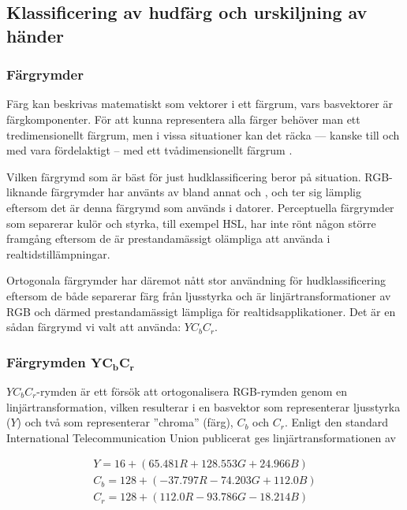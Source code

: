\documentclass[../rapport_MVEX01-11-05]{subfiles}
\begin{document}
\subsection{Klassificering av hudfärg och urskiljning av händer}

\subsubsection{Färgrymder}

Färg kan beskrivas matematiskt som vektorer i ett färgrum, vars
basvektorer är färgkomponenter. För att kunna representera alla färger
behöver man ett tredimensionellt färgrum, men i vissa situationer kan
det räcka --- kanske till och med vara fördelaktigt -- med ett
tvådimensionellt färgrum \cite{Kakumanu07}.


Vilken färgrymd som är bäst för just hudklassificering beror på
situation. RGB-liknande färgrymder har använts av bland annat
 och , och ter sig lämplig
eftersom det är denna färgrymd som används i datorer. Perceptuella
färgrymder som separerar kulör och styrka, till exempel HSL, har inte
rönt någon större framgång eftersom de är prestandamässigt olämpliga
att använda i realtidstillämpningar.

Ortogonala färgrymder har däremot nått stor användning för
hudklassificering \cite{Hsu02,Elmezain08,Hassanpour08} eftersom de
både separerar färg från ljusstyrka och är linjärtransformationer av
RGB och därmed prestandamässigt lämpliga för realtidsapplikationer.
Det är en sådan färgrymd vi valt att använda: $YC_bC_r$.

\subsubsection[Färgrymden $\mathrm{YC_bC_r}$]{Färgrymden $\mathbf{YC_bC_r}$}

$YC_bC_r$-rymden är ett försök att ortogonalisera RGB-rymden genom en
linjärtransformation, vilken resulterar i en basvektor som
representerar ljusstyrka ($Y$) och två som representerar ''chroma''
(färg), $C_b$ och $C_r$. Enligt den standard International
Telecommunication Union publicerat \cite{ITU-BT601} ges
linjärtransformationen av

\begin{equation*}
  \label{eq:farg:ycbcr}
  \begin{gathered}
  Y   = 16  + ( 65.481R + 128.553G + 24.966B)\\
  C_b = 128 + (-37.797R - 74.203G  + 112.0B )\\
  C_r = 128 + (112.0R   - 93.786G  - 18.214B)
  \end{gathered}
\end{equation*}
\end{document}
